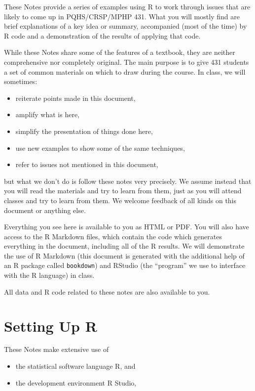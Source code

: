 \documentclass[
]{book}
\providecommand{\tightlist}{%
  \setlength{\itemsep}{0pt}\setlength{\parskip}{0pt}}
\begin{document}
These Notes provide a series of examples using R to work through issues that are likely to come up in PQHS/CRSP/MPHP 431. What you will mostly find are brief explanations of a key idea or summary, accompanied (most of the time) by R code and a demonstration of the results of applying that code.

While these Notes share some of the features of a textbook, they are neither comprehensive nor completely original. The main purpose is to give 431 students a set of common materials on which to draw during the course. In class, we will sometimes:

\begin{itemize}
\tightlist
\item
  reiterate points made in this document,
\item
  amplify what is here,
\item
  simplify the presentation of things done here,
\item
  use new examples to show some of the same techniques,
\item
  refer to issues not mentioned in this document,
\end{itemize}

but what we don't do is follow these notes very precisely. We assume instead that you will read the materials and try to learn from them, just as you will attend classes and try to learn from them. We welcome feedback of all kinds on this document or anything else.

Everything you see here is available to you as HTML or PDF. You will also have access to the R Markdown files, which contain the code which generates everything in the document, including all of the R results. We will demonstrate the use of R Markdown (this document is generated with the additional help of an R package called \texttt{bookdown}) and RStudio (the ``program'' we use to interface with the R language) in class.

All data and R code related to these notes are also available to you.

\hypertarget{setting-up-r}{%
\section*{Setting Up R}\label{setting-up-r}}

These Notes make extensive use of

\begin{itemize}
\tightlist
\item
  the statistical software language R, and
\item
  the development environment R Studio,
\end{itemize}
\end{document}

